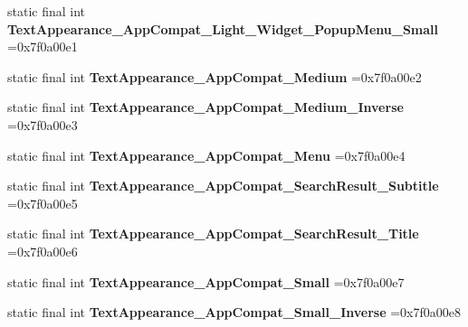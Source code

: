 \begin{DoxyCompactItemize}
\mbox{\label{classproject4_1_1xaria_1_1R_1_1style_a7ebda0d9382b26871dda5cbc139fc37e}} 
static final int {\bfseries Text\+Appearance\+\_\+\+App\+Compat\+\_\+\+Light\+\_\+\+Widget\+\_\+\+Popup\+Menu\+\_\+\+Small} =0x7f0a00e1
\item 
\mbox{\label{classproject4_1_1xaria_1_1R_1_1style_a44c36e22ce544dde2139b9b1d20010ff}} 
static final int {\bfseries Text\+Appearance\+\_\+\+App\+Compat\+\_\+\+Medium} =0x7f0a00e2
\item 
\mbox{\label{classproject4_1_1xaria_1_1R_1_1style_ad6a6c705c0bdfa6e7d1bc445d3aeea59}} 
static final int {\bfseries Text\+Appearance\+\_\+\+App\+Compat\+\_\+\+Medium\+\_\+\+Inverse} =0x7f0a00e3
\item 
\mbox{\label{classproject4_1_1xaria_1_1R_1_1style_a24176a923e491b3702ef29f5776737c9}} 
static final int {\bfseries Text\+Appearance\+\_\+\+App\+Compat\+\_\+\+Menu} =0x7f0a00e4
\item 
\mbox{\label{classproject4_1_1xaria_1_1R_1_1style_ad73704224dc9bac05d3a055a98666789}} 
static final int {\bfseries Text\+Appearance\+\_\+\+App\+Compat\+\_\+\+Search\+Result\+\_\+\+Subtitle} =0x7f0a00e5
\item 
\mbox{\label{classproject4_1_1xaria_1_1R_1_1style_a3699612e8ac2cdfe8dc010c1bc127e3d}} 
static final int {\bfseries Text\+Appearance\+\_\+\+App\+Compat\+\_\+\+Search\+Result\+\_\+\+Title} =0x7f0a00e6
\item 
\mbox{\label{classproject4_1_1xaria_1_1R_1_1style_a11cca13e17ce8094eda569e3187c91b0}} 
static final int {\bfseries Text\+Appearance\+\_\+\+App\+Compat\+\_\+\+Small} =0x7f0a00e7
\item 
\mbox{\label{classproject4_1_1xaria_1_1R_1_1style_ab9691f53c3bb22bf439e074338dbd21f}} 
static final int {\bfseries Text\+Appearance\+\_\+\+App\+Compat\+\_\+\+Small\+\_\+\+Inverse} =0x7f0a00e8
\item 
\mbox{\label{classproject4_1_1xaria_1_1R_1_1style_a4e67d09dae61313eea8255c8d13f5acc}} 

\end{DoxyCompactItemize}

